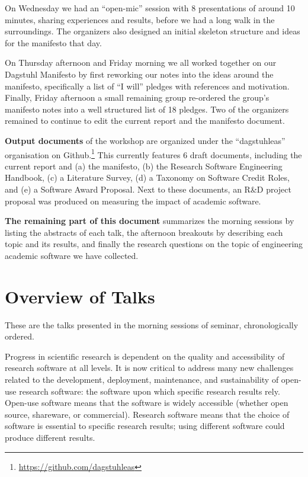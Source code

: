 \documentclass[a4paper,UKenglish]{dagrep}
\begin{document}
On Wednesday we had an ``open-mic'' session with 8 presentations of around 10 minutes, sharing experiences and results, before we had a long walk in the surroundings. The organizers also designed an initial skeleton structure and ideas for the manifesto that day.

On Thursday afternoon and Friday morning we all worked together on our Dagstuhl Manifesto by first reworking our notes into the ideas around the manifesto, specifically a list of ``I will'' pledges with references and motivation. Finally, Friday afternoon a small remaining group re-ordered the group's manifesto notes into a well structured list of 18 pledges. Two of the organizers remained to continue to edit the current report and the manifesto document.

\textbf{Output documents} of the workshop are organized under the ``dagstuhleas'' organisation on Github.\footnote{\url{https://github.com/dagstuhleas}} This currently features 6 draft documents, including the current report and (a) the manifesto, (b) the Research Software Engineering Handbook, (c) a Literature Survey, (d) a Taxonomy on Software Credit Roles, and (e) a Software Award Proposal. Next to these documents, an R\&D project proposal was produced on measuring the impact of academic software.

\textbf{The remaining part of this document} summarizes the morning sessions by listing the abstracts of each talk, the afternoon breakouts by describing each topic and its results, and finally the research questions on the topic of engineering academic software we have collected.

\tableofcontents

\section{Overview of Talks}

These are the talks presented in the morning sessions of seminar, chronologically ordered.



Progress in scientific research is dependent on the quality and accessibility of research software at all levels. It is now critical to address many new challenges related to the development, deployment, maintenance, and sustainability of open-use research software: the software upon which specific research results rely.  Open-use software means that the software is widely accessible (whether open source, shareware, or commercial).  Research software means that the choice of software is essential to specific research results; using different software could produce different results.
\end{document}
